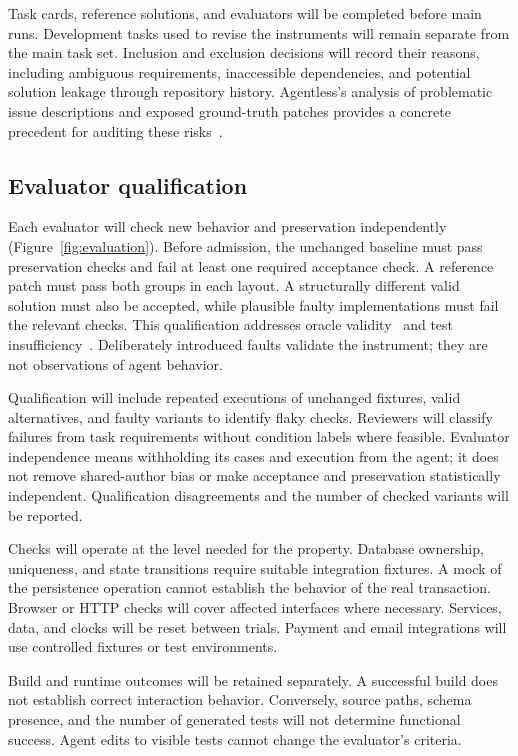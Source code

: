 \documentclass[11pt,a4paper]{article}
\begin{document}
Task cards, reference solutions, and evaluators will be completed before main runs. Development tasks used to revise the instruments will remain separate from the main task set. Inclusion and exclusion decisions will record their reasons, including ambiguous requirements, inaccessible dependencies, and potential solution leakage through repository history. Agentless's analysis of problematic issue descriptions and exposed ground-truth patches provides a concrete precedent for auditing these risks~\cite{xia2024agentless}.

\subsection{Evaluator qualification}
Each evaluator will check new behavior and preservation independently (Figure~\ref{fig:evaluation}). Before admission, the unchanged baseline must pass preservation checks and fail at least one required acceptance check. A reference patch must pass both groups in each layout. A structurally different valid solution must also be accepted, while plausible faulty implementations must fail the relevant checks. This qualification addresses oracle validity~\cite{barr2015oracle} and test insufficiency~\cite{liu2023evalplus}. Deliberately introduced faults validate the instrument; they are not observations of agent behavior.

Qualification will include repeated executions of unchanged fixtures, valid alternatives, and faulty variants to identify flaky checks. Reviewers will classify failures from task requirements without condition labels where feasible. Evaluator independence means withholding its cases and execution from the agent; it does not remove shared-author bias or make acceptance and preservation statistically independent. Qualification disagreements and the number of checked variants will be reported.



Checks will operate at the level needed for the property. Database ownership, uniqueness, and state transitions require suitable integration fixtures. A mock of the persistence operation cannot establish the behavior of the real transaction. Browser or HTTP checks will cover affected interfaces where necessary. Services, data, and clocks will be reset between trials. Payment and email integrations will use controlled fixtures or test environments.

Build and runtime outcomes will be retained separately. A successful build does not establish correct interaction behavior. Conversely, source paths, schema presence, and the number of generated tests will not determine functional success. Agent edits to visible tests cannot change the evaluator's criteria.
\end{document}
